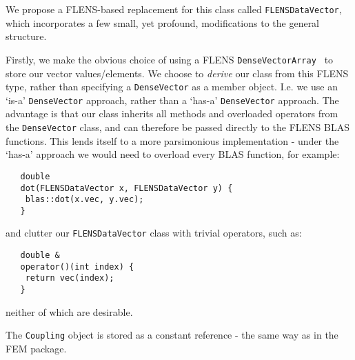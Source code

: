 We propose a FLENS-based replacement for this class called \texttt{FLENSDataVector}, which incorporates a few small, yet profound, modifications to the general structure.

Firstly, we make the obvious choice of using a FLENS \texttt{DenseVector\<Array\<\double\> \>} to store our vector values/elements. We choose to \emph{derive} our class from this FLENS type, rather than specifying a \texttt{DenseVector} as a member object. I.e. we use an `is-a' \texttt{DenseVector} approach, rather than a `has-a' \texttt{DenseVector} approach. The advantage is that our class inherits all methods and overloaded operators from the \texttt{DenseVector} class, and can therefore be passed directly to the FLENS BLAS functions. This lends itself to a more parsimonious implementation - under the `has-a' approach we would need to overload every BLAS function, for example: 
\begin{lstlisting}
   double
   dot(FLENSDataVector x, FLENSDataVector y) {
   	blas::dot(x.vec, y.vec);
   }
\end{lstlisting}

and clutter our \texttt{FLENSDataVector} class with trivial operators, such as:

\begin{lstlisting}
   double &
   operator()(int index) {
   	return vec(index);
   }
\end{lstlisting}

neither of which are desirable.

The \texttt{Coupling} object is stored as a constant reference - the same way as in the FEM package.

